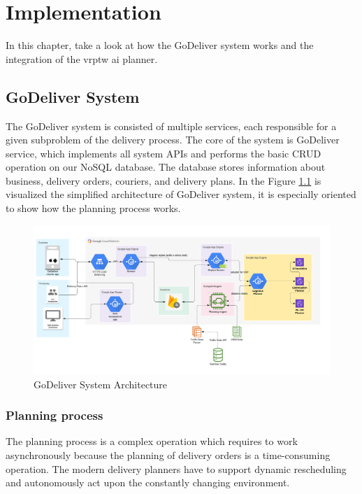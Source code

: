 \chapter{Implementation}

In this chapter, take a look at how the GoDeliver system works and the integration of the \gls{vrptw} \gls{ai} planner.

\section{GoDeliver System}

The GoDeliver system is consisted of multiple services, each responsible for a given subproblem of the delivery process. The core of the system is GoDeliver service, which implements all system APIs and performs the basic CRUD operation on our NoSQL database. The database stores information about business, delivery orders, couriers, and delivery plans. In the Figure \ref{fig:godeliver-system} is visualized the simplified architecture of GoDeliver system, it is especially oriented to show how the planning process works.

\begin{figure}[ht]
    \centering
    \includegraphics[width=1.0\textwidth]{resources/implementation/godeliver-system.png}
    \caption{GoDeliver System Architecture}
    \label{fig:godeliver-system}
\end{figure}

\subsection{Planning process}
The planning process is a complex operation which requires to work asynchronously because the planning of delivery orders is a time-consuming operation. The modern delivery planners have to support dynamic rescheduling and autonomously act upon the constantly changing environment.

